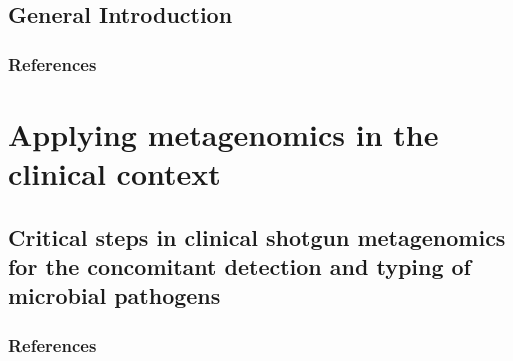 \documentclass[12pt,a4paper,twoside,openright]{book}
\begin{document}
\begin{sloppy}
\newpage
\thispagestyle{plain}
\renewcommand{\contentsname}{Table of Contents}
\tableofcontents
\clearpage \thispagestyle{empty}\mbox{}\clearpage
\newpage
\thispagestyle{plain}
\listoftables
\clearpage \thispagestyle{empty}\mbox{}\clearpage
\newpage
\thispagestyle{plain}
\listoffigures

\mainmatter

\newpage
\thispagestyle{empty}
\chapter{General Introduction\label{ch:introduction}}
\thispagestyle{empty}
\clearpage \thispagestyle{empty}\mbox{}\clearpage
\newpage
\begin{refsection}

\newpage
\section{References}
\printbibliography[heading=none]
\end{refsection}

\part{Applying metagenomics in the clinical context}
\newpage
\thispagestyle{empty}
\chapter{Critical steps in clinical shotgun metagenomics for the concomitant detection and typing of microbial pathogens\label{ch:paper1}}

\thispagestyle{empty}
\clearpage \thispagestyle{empty}\mbox{}\clearpage
\newpage
\begin{refsection}

\newpage
\section{References}
\printbibliography[heading=none]
\end{refsection}


\end{sloppy}
\end{document}
